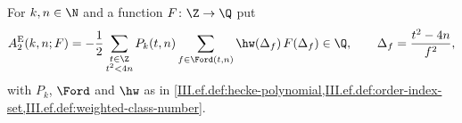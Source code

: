 For $k,n\in\N$ and a function $F\colon\Z\to\Q$ put
\[
  A_2^{\mathrm E}(k,n;F)=-\frac12\sum_{\substack{t\in\Z\\ t^2<4n}}P_k(t,n)\sum_{f\in\Ford(t,n)}\hw(\Delta_f)\,F(\Delta_f)\in\Q,\qquad
  \Delta_f=\frac{t^2-4n}{f^2},
\]
with $P_k$, $\Ford$ and $\hw$ as in \cref{III.ef.def:hecke-polynomial,III.ef.def:order-index-set,III.ef.def:weighted-class-number}.

